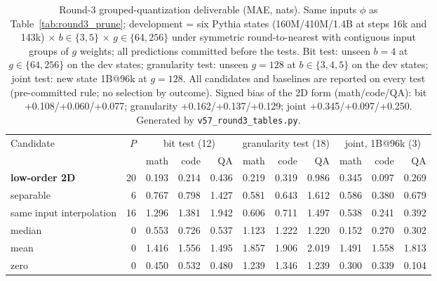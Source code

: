\begin{table}[t]\centering\footnotesize\setlength{\tabcolsep}{2.5pt}
\begin{tabular}{@{}lrrrrrrrrrr@{}}
\toprule
Candidate & $P$ & \multicolumn{3}{c}{bit test (12)} & \multicolumn{3}{c}{granularity test (18)} & \multicolumn{3}{c}{joint, 1B@96k (3)} \\
\cmidrule(lr){3-5}\cmidrule(lr){6-8}\cmidrule(lr){9-11}
 & & math & code & QA & math & code & QA & math & code & QA \\
\midrule
\textbf{low-order 2D} & 20 & 0.193 & 0.214 & 0.436 & 0.219 & 0.319 & 0.986 & 0.345 & 0.097 & 0.269 \\
separable & 6 & 0.767 & 0.798 & 1.427 & 0.581 & 0.643 & 1.612 & 0.586 & 0.380 & 0.679 \\
same input interpolation & 16 & 1.296 & 1.381 & 1.942 & 0.606 & 0.711 & 1.497 & 0.538 & 0.241 & 0.392 \\
median & 0 & 0.553 & 0.726 & 0.537 & 1.123 & 1.222 & 1.220 & 0.152 & 0.270 & 0.302 \\
mean & 0 & 1.416 & 1.556 & 1.495 & 1.857 & 1.906 & 2.019 & 1.491 & 1.558 & 1.813 \\
zero & 0 & 0.450 & 0.532 & 0.480 & 1.239 & 1.346 & 1.239 & 0.300 & 0.339 & 0.104 \\
\bottomrule\end{tabular}
\caption{Round-3 grouped-quantization deliverable (MAE, nats). Same inputs $\phi$ as Table~\ref{tab:round3_prune}; development = six Pythia states (160M/410M/1.4B at steps 16k and 143k) $\times$ $b\in\{3,5\}$ $\times$ $g\in\{64,256\}$ under symmetric round-to-nearest with contiguous input groups of $g$ weights; all predictions committed before the tests. Bit test: unseen $b{=}4$ at $g\in\{64,256\}$ on the dev states; granularity test: unseen $g{=}128$ at $b\in\{3,4,5\}$ on the dev states; joint test: new state 1B@96k at $g{=}128$. All candidates and baselines are reported on every test (pre-committed rule; no selection by outcome). Signed bias of the 2D form (math/code/QA): bit +0.108/+0.060/+0.077; granularity +0.162/+0.137/+0.129; joint +0.345/+0.097/+0.250. Generated by \texttt{v57\_round3\_tables.py}.}
\label{tab:round3_quant}\end{table}

